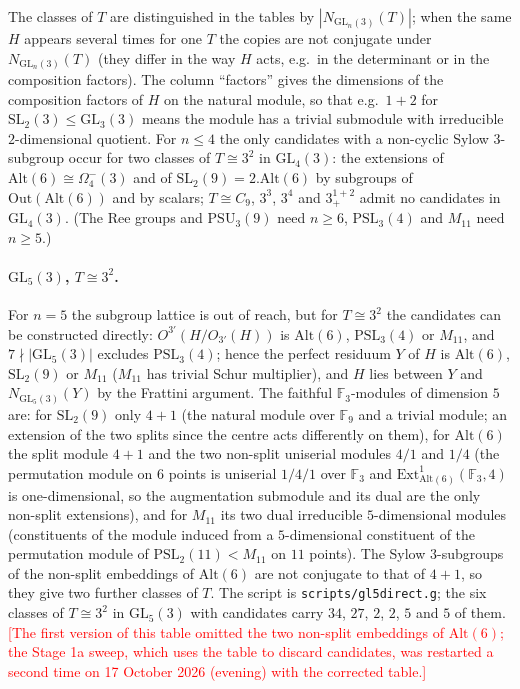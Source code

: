 \documentclass[11pt]{article}
\theoremstyle{definition}
\theoremstyle{remark}
\newcommand{\GL}{\mathrm{GL}}
\newcommand{\SL}{\mathrm{SL}}
\newcommand{\PSL}{\mathrm{PSL}}
\newcommand{\PSU}{\mathrm{PSU}}
\newcommand{\Alt}{\mathrm{Alt}}
\begin{document}
The classes of $T$ are distinguished in the tables by $|N_{\GL_n(3)}(T)|$;
when the same $H$ appears several times for one $T$ the copies are not
conjugate under $N_{\GL_n(3)}(T)$ (they differ in the way $H$ acts, e.g.\ in
the determinant or in the composition factors).  The column ``factors''
gives the dimensions of the composition factors of $H$ on the natural
module, so that e.g.\ $1+2$ for $\SL_2(3)\le\GL_3(3)$ means the module has a
trivial submodule with irreducible $2$-dimensional quotient.  For $n\le 4$
the only candidates with a non-cyclic Sylow $3$-subgroup occur for two
classes of $T\cong 3^2$ in $\GL_4(3)$: the extensions of $\Alt(6)\cong
\Omega_4^-(3)$ and of $\SL_2(9)=2.\Alt(6)$ by subgroups of
$\mathrm{Out}(\Alt(6))$ and by scalars; $T\cong C_9$, $3^3$, $3^4$ and
$3^{1+2}_+$ admit no candidates in $\GL_4(3)$.  (The Ree groups and
$\PSU_3(9)$ need $n\ge 6$, $\PSL_3(4)$ and $M_{11}$ need $n\ge 5$.)





\paragraph{$\GL_5(3)$, $T\cong 3^2$.}  For $n=5$ the subgroup lattice is out
of reach, but for $T\cong 3^2$ the candidates can be constructed directly:
$O^{3'}(H/O_{3'}(H))$ is $\Alt(6)$, $\PSL_3(4)$ or $M_{11}$, and $7\nmid|\GL_5(3)|$
excludes $\PSL_3(4)$; hence the perfect residuum $Y$ of $H$ is $\Alt(6)$,
$\SL_2(9)$ or $M_{11}$ ($M_{11}$ has trivial Schur multiplier), and $H$ lies
between $Y$ and $N_{\GL_5(3)}(Y)$ by the Frattini argument.  The faithful
$\mathbb{F}_3$-modules of dimension $5$ are: for $\SL_2(9)$ only $4+1$ (the
natural module over $\mathbb{F}_9$ and a trivial module; an extension of the
two splits since the centre acts differently on them), for $\Alt(6)$ the
split module $4+1$ and the two non-split uniserial modules $4/1$ and $1/4$
(the permutation module on $6$ points is uniserial $1/4/1$ over
$\mathbb{F}_3$ and $\mathrm{Ext}^1_{\Alt(6)}(\mathbb{F}_3,4)$ is
one-dimensional, so the augmentation submodule and its dual are the only
non-split extensions), and for $M_{11}$ its two dual irreducible
$5$-dimensional modules (constituents of the module induced from a
$5$-dimensional constituent of the permutation module of $\PSL_2(11)<M_{11}$
on $11$ points).  The Sylow $3$-subgroups of the non-split embeddings of
$\Alt(6)$ are not conjugate to that of $4+1$, so they give two further
classes of $T$.  The script is \texttt{scripts/gl5direct.g}; the six
classes of $T\cong3^2$ in $\GL_5(3)$ with candidates carry $34$, $27$, $2$,
$2$, $5$ and $5$ of them.  \textcolor{red}{[The first version of this table
omitted the two non-split embeddings of $\Alt(6)$; the Stage 1a sweep,
which uses the table to discard candidates, was restarted a second time
on 17 October 2026 (evening) with the corrected table.]}

\end{document}
